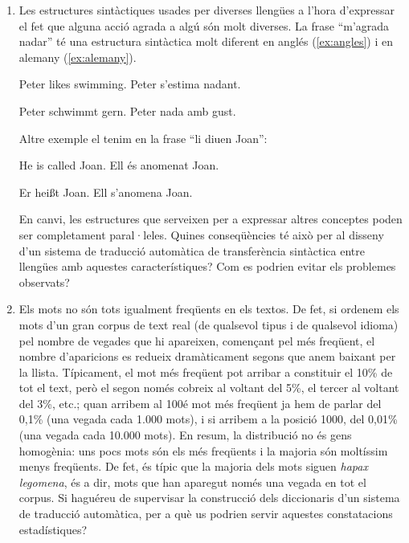 \begin{enumerate}
\item \label{exer:agradar} Les estructures sintàctiques usades per diverses llengües a
  l'hora d'expressar el fet que alguna acció agrada a algú són molt
  diverses. La frase ``m'agrada nadar'' té una estructura sintàctica molt
  diferent en anglés (\ref{ex:angles}) i en alemany (\ref{ex:alemany}).
\begin{example}
\gll Peter likes swimming.
     Peter s'estima nadant.
\glt\glend
\label{ex:angles}
\end{example}
\begin{example}
\gll Peter schwimmt gern.
     Peter nada {amb gust}.
\glt\glend
\label{ex:alemany}
\end{example}
Altre exemple el tenim en la frase  ``li diuen Joan'':
\begin{example}
\gll He is called Joan.
     Ell és anomenat Joan.
\glt\glend
\label{ex:angles2}
\end{example}
\begin{example}
\gll Er hei{\ss}t Joan.
     Ell {s'anomena}  Joan.
\glt\glend
\label{ex:alemany2}
\end{example}
En canvi, les estructures que serveixen per a expressar altres
conceptes poden ser completament paral·leles. Quines conseqüències té
això per al disseny d'un sistema de traducció automàtica de
transferència sintàctica entre llengües amb aquestes característiques?
Com es podrien evitar els problemes observats?

\item Els mots no són tots igualment freqüents en els textos. De
  fet, si ordenem els mots d'un gran corpus de text real (de qualsevol
  tipus i de qualsevol idioma) pel nombre de vegades que hi apareixen,
  començant pel més freqüent, el nombre d'aparicions es redueix
  dramàticament segons que anem baixant per la llista. Típicament, el
  mot més freqüent pot arribar a constituir el 10\% de tot el text,
  però el segon només cobreix al voltant del 5\%, el tercer al voltant
  del 3\%, etc.; quan arribem al 100é mot més freqüent ja hem de
  parlar del 0,1\% (una vegada cada 1.000 mots), i si arribem a la
  posició 1000, del 0,01\% (una vegada cada 10.000 mots).  En resum,
  la distribució no és gens homogènia: uns pocs mots són els més
  freqüents i la majoria són moltíssim menys freqüents. De fet, és
  típic que la majoria dels mots siguen \emph{hapax legomena}, és a
  dir, mots que han aparegut només una vegada en tot el corpus. Si
  haguéreu de supervisar la construcció dels diccionaris d'un sistema
  de traducció automàtica, per a què us podrien servir aquestes
  constatacions estadístiques?


\end{enumerate}

